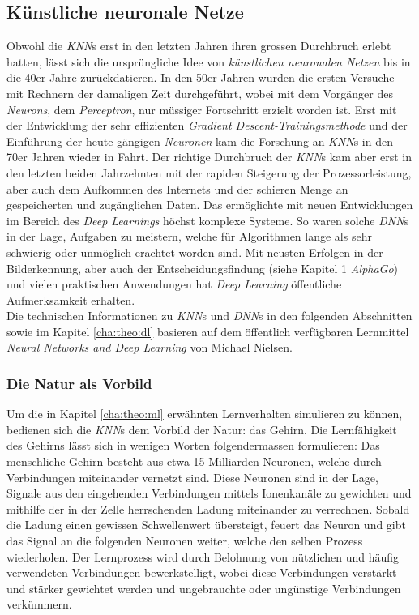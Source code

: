 \subsection[KNNs]{Künstliche neuronale Netze}
Obwohl die \textit{KNN}s erst in den letzten Jahren ihren grossen Durchbruch erlebt hatten, lässt sich die ursprüngliche Idee von \textit{künstlichen neuronalen Netzen} bis in die 40er Jahre zurückdatieren. In den 50er Jahren wurden die ersten Versuche mit Rechnern der damaligen Zeit durchgeführt, wobei mit dem Vorgänger des \textit{Neurons}, dem \textit{Perceptron}, nur müssiger Fortschritt erzielt worden ist. Erst mit der Entwicklung der sehr effizienten \textit{Gradient Descent-Trainingsmethode} und der Einführung der heute gängigen \textit{Neuronen} kam die Forschung an \textit{KNN}s in den 70er Jahren wieder in Fahrt. Der richtige Durchbruch der \textit{KNN}s kam aber erst in den letzten beiden Jahrzehnten mit der rapiden Steigerung der Prozessorleistung, aber auch dem Aufkommen des Internets und der schieren Menge an gespeicherten und zugänglichen Daten. Das ermöglichte mit neuen Entwicklungen im Bereich des \textit{Deep Learnings} höchst komplexe Systeme. So waren solche \textit{DNN}s in der Lage, Aufgaben zu meistern, welche für Algorithmen lange als sehr schwierig oder unmöglich erachtet worden sind. Mit neusten Erfolgen in der Bilderkennung, aber auch der Entscheidungsfindung (siehe Kapitel 1 \textit{AlphaGo}) und vielen praktischen Anwendungen hat \textit{Deep Learning} öffentliche Aufmerksamkeit erhalten\cite{ann}.\\

Die technischen Informationen zu \textit{KNN}s und \textit{DNN}s in den folgenden Abschnitten sowie im Kapitel \ref{cha:theo:dl} basieren auf dem öffentlich verfügbaren Lernmittel \textit{Neural Networks and Deep Learning} von Michael Nielsen\cite{nielsen}.

\subsubsection{Die Natur als Vorbild}
Um die in Kapitel \ref{cha:theo:ml} erwähnten Lernverhalten simulieren zu können, bedienen sich die \textit{KNN}s dem Vorbild der Natur: das Gehirn. Die Lernfähigkeit des Gehirns lässt sich in wenigen Worten folgendermassen formulieren: Das menschliche Gehirn besteht aus etwa 15 Milliarden Neuronen, welche durch  Verbindungen miteinander vernetzt sind. Diese Neuronen sind in der Lage, Signale aus den eingehenden Verbindungen mittels Ionenkanäle zu gewichten und mithilfe der in der Zelle herrschenden Ladung miteinander zu verrechnen. Sobald die Ladung einen gewissen Schwellenwert übersteigt, feuert das Neuron und gibt das Signal an die folgenden Neuronen weiter, welche den selben Prozess wiederholen. Der Lernprozess wird durch Belohnung von nützlichen und häufig verwendeten Verbindungen bewerkstelligt, wobei diese Verbindungen verstärkt und stärker gewichtet werden und ungebrauchte oder ungünstige Verbindungen verkümmern\cite{klett}.


